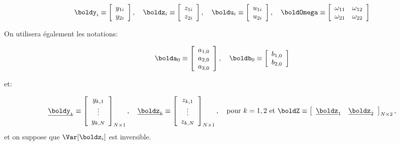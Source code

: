  \begin{align*}
    \boldy_i \equiv 
    \left[
    \begin{array}{l}
        y_{1i}\\
        y_{2i}
    \end{array}
    \right]
    , \quad 
    \boldz_i \equiv 
\left[
\begin{array}{l}
    z_{1i}\\
    z_{2i}
\end{array}
\right]
, \quad 
\boldu_i \equiv 
\left[
\begin{array}{l}
    u_{1i}\\
    u_{2i}
\end{array}
\right]
, \quad 
\boldOmega \equiv
\left[
\begin{array}{ll}
    \omega_{11}&\omega_{12}\\
    \omega_{21}&\omega_{22}
\end{array}
\right]
 \end{align*}
    
 On utilisera également les notations:


 \begin{align*}
    \bolda_0 \equiv 
    \left[
    \begin{array}{l}
        a_{1,0}\\
        a_{2, 0}\\
        a_{3, 0}
    \end{array}
    \right]
    , \quad 
    \boldb_0 \equiv 
 \left[
 \begin{array}{l}
    b_{1,0}\\
    b_{2,0}
\end{array}
 \right]
\end{align*}

et:

\begin{align*}
    \underline{\boldy}_k \equiv 
    \left[
    \begin{array}{c}
        y_{k,1}\\
        \vdots\\
        y_{k, N}
    \end{array}
    \right]_{N\times 1}
    , \quad 
    \underline{\boldz}_k \equiv
    \left[
    \begin{array}{c}
        z_{k,1}\\
        \vdots\\
        z_{k, N}
    \end{array}
    \right]_{N\times 1}
    , \quad \text{pour $k=1, 2$ et} \
    \boldZ \equiv 
    \left[
\begin{array}{ll}
    \underline{\boldz}_1& \underline{\boldz}_2
\end{array}
\right]_{N\times 2},
\end{align*}
et on suppose que $\Var[\boldz_i]$ est inversible.


